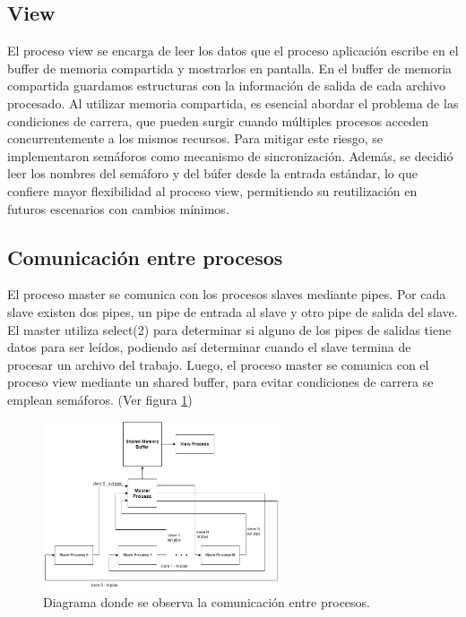 \documentclass{article}
\begin{document}
\subsection{View}

El proceso view se encarga de leer los datos que el proceso aplicación escribe en el buffer de memoria compartida y mostrarlos en pantalla. En el buffer de memoria compartida guardamos estructuras con la información de salida de cada archivo procesado. Al utilizar memoria compartida, es esencial abordar el problema de las condiciones de carrera, que pueden surgir cuando múltiples procesos acceden concurrentemente a los mismos recursos. Para mitigar este riesgo, se implementaron semáforos como mecanismo de sincronización. Además, se decidió leer los nombres del semáforo y del búfer desde la entrada estándar, lo que confiere mayor flexibilidad al proceso view, permitiendo su reutilización en futuros escenarios con cambios mínimos.

\subsection{Comunicación entre procesos}

El proceso master se comunica con los procesos slaves mediante pipes. Por cada slave existen dos pipes, un pipe de entrada al slave y otro pipe de salida del slave. El master utiliza select(2) para determinar si alguno de los pipes de salidas tiene datos para ser leídos, podiendo así determinar cuando el slave termina de procesar un archivo del trabajo. Luego, el proceso master se comunica con el proceso view mediante un shared buffer, para evitar condiciones de carrera se emplean semáforos. (Ver figura \ref{fig:diagramaComunicacion})

\begin{figure}[H]
\begin{center}
\includegraphics[width=70mm]{diagramaComunicacion}
\caption{Diagrama donde se observa la comunicación entre procesos.}
\label{fig:diagramaComunicacion}
\end{center}
\end{figure}
\end{document}
